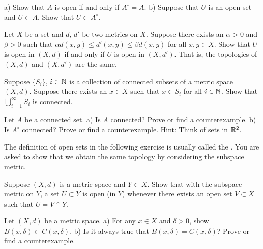 \begin{exercise}
a) Show that $A$ is open if and only if $A^\circ = A$.
b) Suppose that $U$ is an open set and $U \subset A$.  Show
that $U \subset A^\circ$.
\end{exercise}

\begin{exercise}
Let $X$ be a set and $d$, $d'$ be two metrics on $X$.
Suppose there exists an $\alpha > 0$ and $\beta > 0$
such that $\alpha d(x,y) \leq d'(x,y) \leq \beta d(x,y)$ for all $x,y \in X$.
Show that $U$ is open in $(X,d)$ if and only if $U$ is open in $(X,d')$.
That is, the topologies of $(X,d)$ and $(X,d')$ are the same.
\end{exercise}


\begin{exercise}
Suppose $\{ S_i \}$, $i \in {\mathbb{N}}$
is a collection of connected subsets of a metric space $(X,d)$.  Suppose
there exists an $x \in X$ such that $x \in S_i$ for all $i \in {\mathbb{N}}$.
Show that $\bigcup_{i=1}^\infty S_i$ is connected.
\end{exercise}

\begin{exercise}
Let $A$ be a connected set.
a) \nolinebreak Is $\overline{A}$ connected?  Prove or find a counterexample.
b) \nolinebreak Is $A^\circ$ connected?  Prove or find a counterexample.
Hint: Think of sets in ${\mathbb{R}}^2$.
\end{exercise}

\begin{exnote}
The definition of open sets in the following exercise is usually called the
\emph{}.  You are asked to show that
we obtain the same topology by considering the subspace metric.
\end{exnote}

\begin{exercise} \label{exercise:mssubspace}
Suppose $(X,d)$ is a metric space and $Y \subset X$.  Show that
with the subspace metric on $Y$, a set $U \subset Y$
is open (in $Y$) whenever there exists an open set $V \subset X$ such
that $U = V \cap Y$.
\end{exercise}

\begin{exercise}
Let $(X,d)$ be a metric space.
a) For any $x \in X$ and $\delta > 0$, show
$\overline{B(x,\delta)} \subset C(x,\delta)$.
b) Is it always true that
$\overline{B(x,\delta)} = C(x,\delta)$?  Prove or find a counterexample.
\end{exercise}

